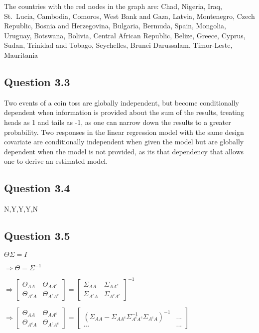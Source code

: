 \documentclass[
]{article}
\begin{document}
The countries with the red nodes in the graph are: Chad, Nigeria, Iraq,
St.~Lucia, Cambodia, Comoros, West Bank and Gaza, Latvia, Montenegro,
Czech Republic, Bosnia and Herzegovina, Bulgaria, Bermuda, Spain,
Mongolia, Uruguay, Botswana, Bolivia, Central African Republic, Belize,
Greece, Cyprus, Sudan, Trinidad and Tobago, Seychelles, Brunei
Darussalam, Timor-Leste, Mauritania

\hypertarget{question-3.3}{%
\subsection{Question 3.3}\label{question-3.3}}

Two events of a coin toss are globally independent, but become
conditionally dependent when information is provided about the sum of
the results, treating heads as 1 and tails as -1, as one can narrow down
the results to a greater probability. Two responses in the linear
regression model with the same design covariate are conditionally
independent when given the model but are globally dependent when the
model is not provided, as its that dependency that allows one to derive
an estimated model.

\hypertarget{question-3.4}{%
\subsection{Question 3.4}\label{question-3.4}}

N,Y,Y,Y,N

\hypertarget{question-3.5}{%
\subsection{Question 3.5}\label{question-3.5}}

\(\Theta\Sigma=I\)

\(\Rightarrow \Theta=\Sigma^{-1}\)

\(\Rightarrow \begin{bmatrix}\Theta_{AA} & \Theta_{AA^c}\\ \Theta_{A^cA} & \Theta_{A^cA^c} \end{bmatrix} = \begin{bmatrix}\Sigma_{AA} & \Sigma_{AA^c}\\ \Sigma_{A^cA} & \Sigma_{A^cA^c} \end{bmatrix}^{-1}\)

\(\Rightarrow \begin{bmatrix}\Theta_{AA} & \Theta_{AA^c}\\ \Theta_{A^cA} & \Theta_{A^cA^c} \end{bmatrix} = \begin{bmatrix}(\Sigma_{AA} - \Sigma_{AA^c}\Sigma_{A^cA^c}^{-1}\Sigma_{A^cA})^{-1} & ... \\ ... & ... \end{bmatrix}\)
\end{document}
